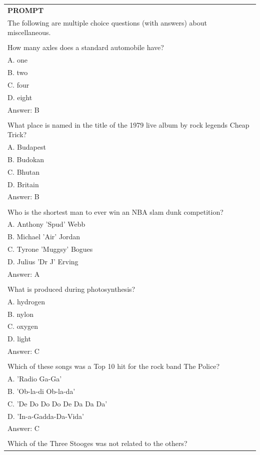 \begin{table}[h]
    \centering \small
\begin{tabular}{p{12cm}}
\toprule
\textbf{PROMPT}\\

The following are multiple choice questions (with answers) about miscellaneous.\\
\\
How many axles does a standard automobile have?\\
A. one\\
B. two\\
C. four\\
D. eight\\
Answer: B\\
\\
What place is named in the title of the 1979 live album by rock legends Cheap Trick?\\
A. Budapest\\
B. Budokan\\
C. Bhutan\\
D. Britain\\
Answer: B\\
\\
Who is the shortest man to ever win an NBA slam dunk competition?\\
A. Anthony 'Spud' Webb\\
B. Michael 'Air' Jordan\\
C. Tyrone 'Muggsy' Bogues\\
D. Julius 'Dr J' Erving\\
Answer: A\\
\\
What is produced during photosynthesis?\\
A. hydrogen\\
B. nylon\\
C. oxygen\\
D. light\\
Answer: C\\
\\
Which of these songs was a Top 10 hit for the rock band The Police?\\
A. 'Radio Ga-Ga'\\
B. 'Ob-la-di Ob-la-da'\\
C. 'De Do Do Do De Da Da Da'\\
D. 'In-a-Gadda-Da-Vida'\\
Answer: C\\
\\
Which of the Three Stooges was not related to the others?\\

\end{tabular}
\end{table}
